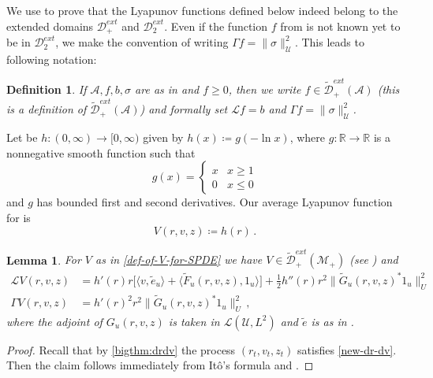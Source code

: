 \documentclass[final]{amsart}
\newtheorem{deff}[thm]{Definition}
\newtheorem{lem}[thm]{Lemma}
\numberwithin{thm}{section}
\numberwithin{equation}{section}
\newcommand{\U}{\mathcal{U}}
\newcommand{\R}{\mathbb{R}}
\newcommand{\inv}{\mathcal{M}_+}
\newcommand{\Dme}{\mathcal{D}^{ext}}
\newcommand{\tDme}{\tilde{\mathcal{D}}^{ext}}
\newcommand{\Ll}{\mathcal{L}}
\newcommand{\ip}[2]{\langle #1, #2 \rangle}
\begin{document}
We use  to prove that the Lyapunov functions defined below indeed belong to the extended domains $\Dme_+$ and $\Dme_2$. Even if the function $f$ from  is not known yet to be in $\Dme_2$, we make the convention of writing $\Gamma f = \|\sigma\|_\U^2$. This leads to following notation:

\begin{deff}\label{spde-tilde-domain}
    If $\mathcal{A},f,b,\sigma$ are as in  and $f \geq 0$, then we write $f \in \tDme_+(\mathcal{A})$ (this is a definition of $\tDme_+(\mathcal{A})$) and formally set $\Ll f = b$ and $\Gamma f = \|\sigma\|_\U^2$.
\end{deff}

Let be $h: (0,\infty) \to [0,\infty)$ given by $h(x) \coloneqq g(-\ln x)$, where $g: \R \to \R$ is a nonnegative smooth function such that
\begin{equation}\label{eq:dfgc}
    g(x) = 
    \begin{cases}
        x & x\geq 1 \\
        0 & x \leq 0
    \end{cases}
\end{equation}
 and $g$ has bounded first and second derivatives. Our average Lyapunov function for  is
\begin{equation}\label{def-of-V-for-SPDE}
    V(r,v,z) \coloneqq h(r) \,.
\end{equation}


\begin{lem}\label{l-v-lemma}
For $V$ as in \eqref{def-of-V-for-SPDE} we have $V \in \tDme_+(\inv)$ (see ) and
    \begin{equation*}
    \begin{aligned}
        \Ll V(r,v,z) &= h'(r)r\Big[\ip{v}{\tilde e_u} + \ip{\tilde F_u(r,v,z)}{1_u}\Big] + \frac{1}{2}h''(r)r^2\|\tilde G_u(r,v,z)^*1_u\|_U^2 \\
        \Gamma V(r,v,z) &= h'(r)^2r^2\|\tilde G_u(r,v,z)^*1_u\|_U^2 \,,
    \end{aligned}
\end{equation*}
where the adjoint of $G_u(r,v,z)$ is taken in $\Ll(\U,L^2)$ and $\tilde e$ is as in .
\end{lem}
\begin{proof}
    Recall that by \ref{bigthm:drdv} the process $(r_t,v_t,z_t)$ satisfies \eqref{new-dr-dv}. Then the claim follows immediately from It\^{o}'s formula and .
\end{proof}
\end{document}
